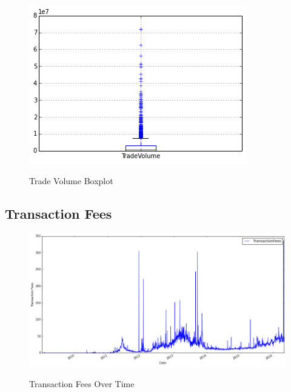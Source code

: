 \begin{figure}[bth]
  \myfloatalign
  {\includegraphics[width=1\linewidth]
    {gfx/trade-volume-boxplot}}
  \caption{Trade Volume
    Boxplot}
  \label{fig:trade-volume-boxplot}
\end{figure}

\clearpage

\subsection{Transaction Fees}
\label{sec:transaction-fees}

\begin{figure}[bth]
  \myfloatalign
  {\includegraphics[width=1\linewidth]
    {gfx/transaction-fees-over-time}}
  \caption{Transaction Fees
    Over Time}
  \label{fig:transaction-fees-over-time}
\end{figure}

